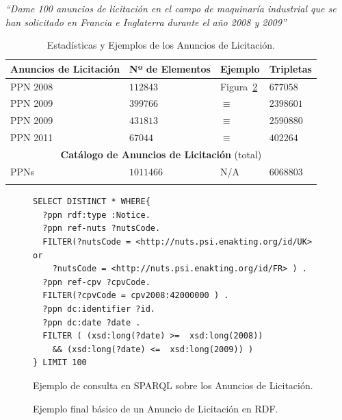\begin{Frame}
 \textit{``Dame 100 anuncios de licitación en el campo de maquinaría industrial que se han solicitado 
en Francia e Inglaterra durante el año 2008 y 2009''}
\end{Frame}
% 
% 
\begin{longtable}[c]{|p{2.5cm}|p{2.5cm}|p{1.8cm}|p{1.8cm}|} 
\hline
  \textbf{Anuncios de Licitación} & \textbf{Nº de Elementos}  &  \textbf{Ejemplo} &  \textbf{Tripletas}  \\\hline
\endhead
PPN 2008 & $112843$  & Figura~\ref{fig:ppn-example-2008}   &  $677058$  \\ \hline
PPN 2009 & $399766$ &  $\equiv$   & $2398601$   \\ \hline
PPN 2009  & $431813$& $\equiv$     & $2590880$  \\ \hline
PPN 2011 & $67044$&  $\equiv$    & $402264$   \\ \hline
\multicolumn{4}{|c|}{\textbf{Catálogo de Anuncios de Licitación} (total)} \\ \hline
PPNs & $1011466$ &  N/A & $6068803$   \\ \hline
\hline
\caption{Estadísticas y Ejemplos de los Anuncios de Licitación.}\label{table:ppn-ejemplos}\\    
\end{longtable}
% 
\begin{figure}[!htp]
\begin{lstlisting} 
SELECT DISTINCT * WHERE{
  ?ppn rdf:type :Notice.
  ?ppn ref-nuts ?nutsCode.
  FILTER(?nutsCode = <http://nuts.psi.enakting.org/id/UK> or 
    ?nutsCode = <http://nuts.psi.enakting.org/id/FR> ) .
  ?ppn ref-cpv ?cpvCode. 
  FILTER(?cpvCode = cpv2008:42000000 ) .
  ?ppn dc:identifier ?id.
  ?ppn dc:date ?date . 
  FILTER ( (xsd:long(?date) >=  xsd:long(2008)) 
    && (xsd:long(?date) <=  xsd:long(2009)) )
} LIMIT 100
\end{lstlisting}
	\caption{Ejemplo de consulta en SPARQL sobre los Anuncios de Licitación.}
	\label{fig:ppng-sparql-query}
\end{figure}
% 
% 
% 
\begin{figure}[!htp]
	
	\caption{Ejemplo final básico de un Anuncio de Licitación en RDF.}
	\label{fig:ppn-example-2008}
\end{figure}

%
